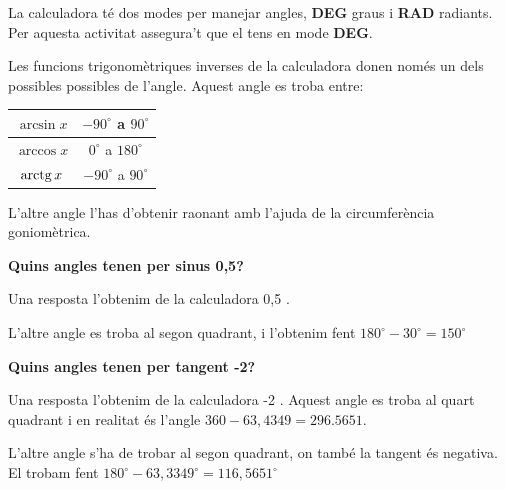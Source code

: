 \begin{blueshaded}
	La calculadora té dos modes per manejar angles, \textbf{DEG} graus i \textbf{RAD} radiants. Per aquesta activitat assegura't que el tens en mode \textbf{DEG}.
	
	\begin{minipage}{0.6\textwidth}
		Les funcions trigonomètriques inverses de la calculadora donen només un dels possibles possibles de l'angle. Aquest angle es troba entre:
	\end{minipage}
	\begin{minipage}{0.4\textwidth}
		\begin{center}
			\begin{tabular}{c|c}
				$\arcsin x$ & $-90^\circ$ a $90^\circ$ \\ \hline
				$\arccos x$ & $0^\circ$ a $180^\circ$ \\ \hline
				$\mathrm{arctg}\, x$ & $-90^\circ$ a $90^\circ$ \\	
			\end{tabular}
		\end{center}
	\end{minipage}
	
	L'altre angle l'has d'obtenir raonant amb l'ajuda de la circumferència goniomètrica.
	
	\textbf{Quins angles tenen per sinus 0,5?}
	
	Una resposta l'obtenim de la calculadora   0,5 \tecla{=} .
	
	L'altre angle es troba al segon quadrant, i l'obtenim fent $180^\circ-30^\circ=150^\circ$
	
	\textbf{Quins angles tenen per tangent -2?}
	
	Una resposta l'obtenim de la calculadora   -2 \tecla{=} . Aquest angle es troba al quart quadrant i en
	realitat és l'angle $360-63,4349=296.5651$.
	
	L'altre angle s'ha de trobar al segon quadrant, on també la tangent és negativa. El trobam fent $180^\circ-63,3349^\circ=116,5651^\circ$
\end{blueshaded}
